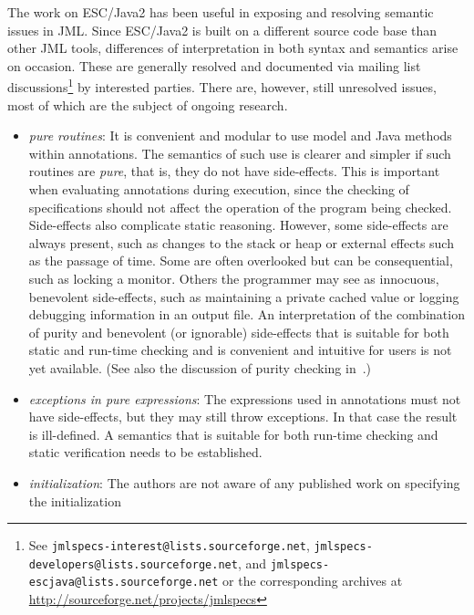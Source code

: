 \documentclass{article}
\begin{document}
The work on ESC/Java2 has been useful in exposing and resolving
semantic issues in JML.  Since ESC/Java2 is built on a different
source code base than other JML tools, differences of interpretation
in both syntax and semantics arise on occasion.  These are generally
resolved and documented via mailing list discussions\footnote{See \texttt{jmlspecs-interest@lists.sourceforge.net}, 
\texttt{jmlspecs-developers@lists.sourceforge.net}, and
\texttt{jmlspecs-escjava@lists.sourceforge.net} or the corresponding archives at \url{http://sourceforge.net/projects/jmlspecs}}
by interested
parties.  There are, however, still unresolved issues, most of which
are the subject of ongoing research.
\setlength{\partopsep}{0in}\setlength{\parskip}{0in}\setlength{\itemsep}{0in}\setlength{\topsep}{0in}
\begin{itemize}
\setlength{\partopsep}{0in}\setlength{\parskip}{0in}\setlength{\itemsep}{0in}\setlength{\topsep}{0in}
\item \textit{pure routines}:  It is convenient and modular to use model and Java methods within
annotations.  The semantics of such use is clearer and simpler if such routines are {\em pure}, that is, they do not have side-effects.  This is important when evaluating annotations during
execution, since the checking of specifications should not affect the operation of the program being
checked.  Side-effects also complicate static reasoning.   However, some side-effects are
always present, such as changes to the stack or heap or external effects such as the passage of time.  Some are often overlooked but can be consequential, such as locking a monitor. 
 Others the programmer may
see as innocuous, benevolent side-effects, such as maintaining a private cached value or logging debugging information in an output file.
An interpretation of the combination of purity and benevolent (or ignorable)
  side-effects that is suitable for both static and run-time checking and is convenient and intuitive
for users is not yet available. (See also the discussion of purity checking in~\cite{Leavens-etal03a}.)
\item \textit{exceptions in pure expressions}:  The expressions used in annotations must not have
side-effects, but they may still throw exceptions.  In that case the result is ill-defined.  A
semantics that is suitable for both run-time checking and static verification needs to be 
established.
\item \textit{initialization}:  The authors are not aware of any published work on specifying the initialization

\end{itemize}
\end{document}
